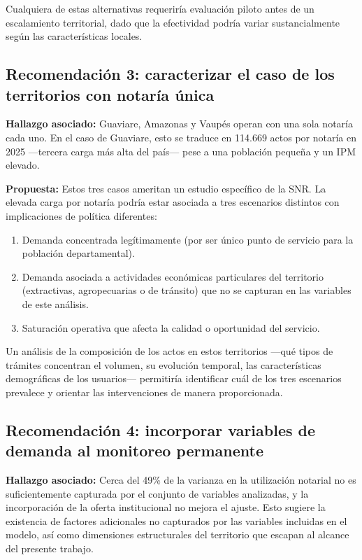 \documentclass{article}
\begin{document}
Cualquiera de estas alternativas requeriría evaluación piloto antes
de un escalamiento territorial, dado que la efectividad podría variar
sustancialmente según las características locales.

\subsection{Recomendación 3: caracterizar el caso de los territorios con notaría única}

\textbf{Hallazgo asociado:} Guaviare, Amazonas y Vaupés operan con
una sola notaría cada uno. En el caso de Guaviare, esto se traduce en
114.669 actos por notaría en 2025 ---tercera carga más alta del país---
pese a una población pequeña y un IPM elevado.

\textbf{Propuesta:} Estos tres casos ameritan un estudio específico
de la SNR. La elevada carga por notaría podría estar asociada a tres
escenarios distintos con implicaciones de política diferentes:

\begin{enumerate}
    \item Demanda concentrada legítimamente (por ser único punto de
    servicio para la población departamental).
    \item Demanda asociada a actividades económicas particulares del
    territorio (extractivas, agropecuarias o de tránsito) que no se
    capturan en las variables de este análisis.
    \item Saturación operativa que afecta la calidad o oportunidad
    del servicio.
\end{enumerate}

Un análisis de la composición de los actos en estos territorios
---qué tipos de trámites concentran el volumen, su evolución temporal,
las características demográficas de los usuarios--- permitiría
identificar cuál de los tres escenarios prevalece y orientar las
intervenciones de manera proporcionada.

\subsection{Recomendación 4: incorporar variables de demanda al monitoreo permanente}

\textbf{Hallazgo asociado:} Cerca del 49\% de la varianza en la
utilización notarial no es suficientemente capturada por el conjunto de variables analizadas, y la incorporación de la oferta institucional no mejora el ajuste. 
Esto sugiere la existencia de factores adicionales no capturados por las variables incluidas en el modelo, así como dimensiones estructurales del territorio que escapan al alcance del presente trabajo.
\end{document}
